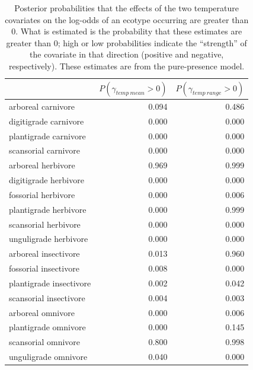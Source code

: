 \documentclass[12pt,letterpaper]{article}
\begin{document}
\begin{table}[ht]
  \centering
  \caption[Posterior probablity of effects of temperature on occurrence]{Posterior probabilities that the effects of the two temperature covariates on the log-odds of an ecotype occurring are greater than 0. What is estimated is the probability that these estimates are greater than 0; high or low probabilities indicate the ``strength'' of the covariate in that direction (positive and negative, respectively). These estimates are from the pure-presence model.}
  \label{tab:occur_temp}
  \begin{tabular}{ l r r }
    \hline
    & \(P(\gamma_{temp\ mean} > 0)\) & \(P(\gamma_{temp\ range} > 0)\) \\ 
    \hline
    arboreal carnivore & 0.094 & 0.486 \\ 
    digitigrade carnivore & 0.000 & 0.000 \\ 
    plantigrade carnivore & 0.000 & 0.000 \\ 
    scansorial carnivore & 0.000 & 0.000 \\ 
    arboreal herbivore & 0.969 & 0.999 \\ 
    digitigrade herbivore & 0.000 & 0.000 \\ 
    fossorial herbivore & 0.000 & 0.006 \\ 
    plantigrade herbivore & 0.000 & 0.999 \\ 
    scansorial herbivore & 0.000 & 0.000 \\ 
    unguligrade herbivore & 0.000 & 0.000 \\ 
    arboreal insectivore & 0.013 & 0.960 \\ 
    fossorial insectivore & 0.008 & 0.000 \\ 
    plantigrade insectivore & 0.002 & 0.042 \\ 
    scansorial insectivore & 0.004 & 0.003 \\ 
    arboreal omnivore & 0.000 & 0.006 \\ 
    plantigrade omnivore & 0.000 & 0.145 \\ 
    scansorial omnivore & 0.800 & 0.998 \\ 
    unguligrade omnivore & 0.040 & 0.000 \\ 
    \hline
  \end{tabular}
\end{table}
\end{document}
